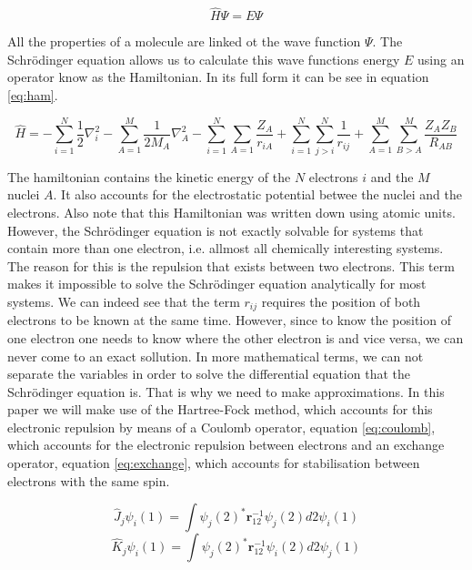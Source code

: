 \documentclass[twoside,twocolumn,9pt]{article}
\begin{document}
\begin{equation}\label{eq:erwin}
  \hat{H}\Psi = E\Psi
\end{equation}

All the properties of a molecule are linked ot the wave function $\Psi$. The Schrödinger equation allows us to calculate this wave functions energy $E$ using an operator
know as the Hamiltonian. In its full form it can be see in equation \eqref{eq:ham}\cite{Szabo1996}.

\begin{equation}\label{eq:ham}
  \hat{H} = -\sum_{i=1}^N\frac{1}{2}\nabla^2_i - \sum_{A=1}^M \frac{1}{2M_A}\nabla^2_A - \sum_{i=1}^N\sum_{A=1}\frac{Z_A}{r_{iA}} + \sum_{i=1}^N\sum_{j>i}^N\frac{1}{r_{ij}} +
  \sum_{A=1}^M\sum_{B>A}^M\frac{Z_A Z_B}{R_{AB}}
\end{equation}

The hamiltonian contains the kinetic energy of the $N$ electrons $i$ and the $M$ nuclei $A$. It also accounts for the electrostatic potential betwee the nuclei and the electrons.
Also note that this Hamiltonian was written down using atomic units. However, the Schrödinger equation is not exactly solvable for systems that contain more than one electron, i.e.
allmost all chemically interesting systems. The reason for this is the repulsion that exists between two electrons. This term makes it impossible to solve the Schrödinger equation
analytically for most systems. We can indeed see that the term $r_{ij}$ requires the position of both electrons to be known at the same time. However, since to know the position of
one electron one needs to know where the other electron is and vice versa, we can never come to an exact sollution. In more mathematical terms, we can not separate the variables
in order to solve the differential equation that the Schrödinger equation is. That is why we need to make approximations. In this paper we will make use of the Hartree-Fock method,
which accounts for this electronic repulsion by means of a Coulomb operator, equation \eqref{eq:coulomb}, which accounts for the electronic repulsion between electrons and an exchange
operator, equation \eqref{eq:exchange}, which accounts for stabilisation between electrons with the same spin.

\begin{equation}\label{eq:coulomb}
  \hat{J}_j\psi_i(1) = \int\psi_j(2)^*\boldsymbol{r}_{12}^{-1}\psi_j(2)d2 \psi_i(1)
\end{equation}
\begin{equation}\label{eq:exchange}
  \hat{K}_j\psi_i(1) = \int\psi_j(2)^*\boldsymbol{r}_{12}^{-1}\psi_i(2)d2 \psi_j(1)
\end{equation}
\end{document}

